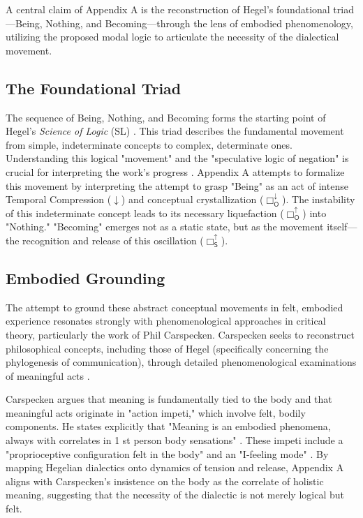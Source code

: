 \documentclass[12pt]{book}
\newcommand{\SBoxUp}{\Box_{\mathsf{S}}^{\uparrow}}
\newcommand{\OBoxUp}{\Box_{\mathsf{O}}^{\uparrow}}
\newcommand{\OBoxDown}{\Box_{\mathsf{O}}^{\downarrow}}
\begin{document}
A central claim of Appendix A is the reconstruction of Hegel's foundational triad—Being, Nothing, and Becoming—through the lens of embodied phenomenology, utilizing the proposed modal logic to articulate the necessity of the dialectical movement.

\subsection{The Foundational Triad}

The sequence of Being, Nothing, and Becoming forms the starting point of Hegel's \textit{Science of Logic} (SL) \parencite{inwood1992hegel, Hegel1830Logic}. This triad describes the fundamental movement from simple, indeterminate concepts to complex, determinate ones. Understanding this logical "movement" and the "speculative logic of negation" is crucial for interpreting the work's progress \parencite[p. 38]{Pippin:2019aa}. Appendix A attempts to formalize this movement by interpreting the attempt to grasp "Being" as an act of intense Temporal Compression ($\downarrow$) and conceptual crystallization ($\OBoxDown$). The instability of this indeterminate concept leads to its necessary liquefaction ($\OBoxUp$) into "Nothing." "Becoming" emerges not as a static state, but as the movement itself—the recognition and release of this oscillation ($\SBoxUp$).

\subsection{Embodied Grounding}

The attempt to ground these abstract conceptual movements in felt, embodied experience resonates strongly with phenomenological approaches in critical theory, particularly the work of Phil Carspecken. Carspecken seeks to reconstruct philosophical concepts, including those of Hegel (specifically concerning the phylogenesis of communication), through detailed phenomenological examinations of meaningful acts \parencite{Carspecken1999}.

Carspecken argues that meaning is fundamentally tied to the body and that meaningful acts originate in "action impeti," which involve felt, bodily components. He states explicitly that "Meaning is an embodied phenomena, always with correlates in 1 st person body sensations" \parencite[p. 20]{Carspecken1995aa}. These impeti include a "proprioceptive configuration felt in the body" and an "I-feeling mode" \parencite[p. 20]{Carspecken1995aa}. By mapping Hegelian dialectics onto dynamics of tension and release, Appendix A aligns with Carspecken's insistence on the body as the correlate of holistic meaning, suggesting that the necessity of the dialectic is not merely logical but felt.
\end{document}
